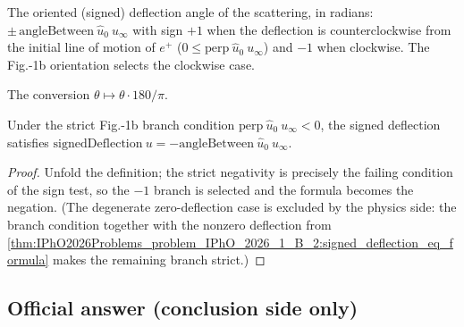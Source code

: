 \begin{definition}
\label{def:IPhO2026Problems_problem_IPhO_2026_1_B_2:signedDeflection}
The oriented (signed) deflection angle of the scattering, in radians:
$\pm\, \mathrm{angleBetween}\ \hat u_0\ u_\infty$ with sign $+1$ when the
deflection is counterclockwise from the initial line of motion of $e^+$
($0 \le \mathrm{perp}\ \hat u_0\ u_\infty$) and $-1$ when clockwise.  The
Fig.-1b orientation selects the clockwise case.
\end{definition}

\begin{definition}
\label{def:IPhO2026Problems_problem_IPhO_2026_1_B_2:radiansToDegrees}
The conversion $\theta \mapsto \theta \cdot 180/\pi$.
\end{definition}

\begin{lemma}
\label{lem:IPhO2026Problems_problem_IPhO_2026_1_B_2:signedDeflection_eq_neg_angle}
Under the strict Fig.-1b branch condition
$\mathrm{perp}\ \hat u_0\ u_\infty < 0$, the signed deflection satisfies
$\mathrm{signedDeflection}\ u = -\mathrm{angleBetween}\ \hat u_0\ u_\infty$.
\end{lemma}
\begin{proof}
Unfold the definition; the strict negativity is precisely the failing
condition of the sign test, so the $-1$ branch is selected and the formula
becomes the negation.  (The degenerate zero-deflection case is excluded by
the physics side: the branch condition together with the nonzero
deflection from
\cref{thm:IPhO2026Problems_problem_IPhO_2026_1_B_2:signed_deflection_eq_formula}
makes the remaining branch strict.)
\end{proof}

\subsection*{Official answer (conclusion side only)}

